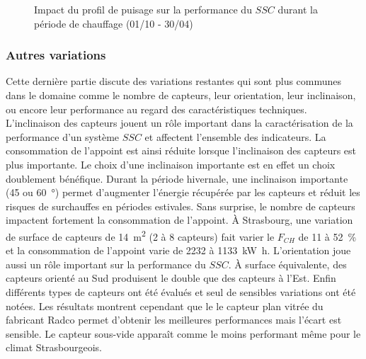 \begin{figure}
    \begin{center}
    \end{center}
    \caption{Impact du profil de puisage sur la performance
             du $SSC$ durant la période de chauffage (01/10 - 30/04)
             \label{fig:impact_profil_puisage}}
\end{figure}


\subsubsection{Autres variations} %
\label{ssub:autres_variations}
Cette dernière partie discute des variations restantes qui sont plus communes dans
le domaine comme le nombre de capteurs, leur orientation, leur inclinaison, ou encore
leur performance au regard des caractéristiques techniques.
L’inclinaison des capteurs jouent un rôle important
dans la caractérisation de la performance d’un système $SSC$ et affectent l’ensemble
des indicateurs. La consommation de l’appoint est ainsi réduite lorsque l’inclinaison
des capteurs est plus importante. Le choix d’une inclinaison importante est en effet
un choix doublement bénéfique. Durant la période hivernale, une inclinaison importante
(\num{45} ou \SI{60}{\degree}) permet d’augmenter l’énergie récupérée par les capteurs
et réduit les risques de surchauffes en périodes estivales.
Sans surprise, le nombre de capteurs impactent fortement la consommation
de l’appoint. À Strasbourg, une variation de surface de capteurs de \SI{14}{\meter\squared} (\num{2} à \num{8} capteurs)
fait varier le $F_{CH}$ de \num{11} à \SI{52}{\percent} et la consommation de l’appoint
varie de \num{2232} à \SI{1133}{\kilo\watt\hour}.
L’orientation joue aussi un rôle important sur la performance du $SSC$. À surface équivalente,
des capteurs orienté au Sud produisent le double que des capteurs à l’Est.
Enfin différents types de capteurs ont été évalués et seul de sensibles variations
ont été notées. Les résultats montrent cependant
que le le capteur plan vitrée du fabricant Radco permet d’obtenir les meilleures
performances mais l’écart est sensible. Le capteur sous-vide apparaît comme le moins
performant même pour le climat Strasbourgeois.

